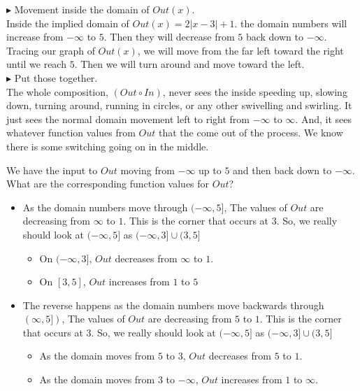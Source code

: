 \documentclass{ximera}
\begin{document}
\textbf{\textcolor{blue!75!black}{$\blacktriangleright$}}  Movement inside the domain of $Out(x)$.\\



Inside the implied domain of $Out(x) =2|x-3|+1$. the domain numbers will increase from $-\infty$ to $5$.  Then they will decrease from $5$ back down to $-\infty$. \\

Tracing our graph of $Out(x)$, we will move from the far left toward the right until we reach $5$.  Then we will turn around and move toward the left.\\



\textbf{\textcolor{blue!75!black}{$\blacktriangleright$}}  Put those together. \\

The whole composition, $(Out \circ In)$, never sees the inside speeding up, slowing down, turning around, running in circles, or any other swivelling and swirling.  It just sees the normal domain movement left to right from $-\infty$ to $\infty$.  And, it sees whatever function values from $Out$ that the come out of the process.  We know there is some switching going on in the middle.

We have the input to $Out$ moving from $-\infty$ up to $5$ and then back down to $-\infty$.  What are the corresponding function values for $Out$?





\begin{itemize}

\item As the domain numbers move through $(-\infty, 5]$, The values of $Out$ are decreasing from $\infty$ to $1$.  This is the corner that occurs at $3$.  So, we really should look at $(-\infty, 5]$  as  $(-\infty, 3] \cup (3,5]$

	\begin{itemize}[label=$\star$]
		\item On $(-\infty, 3]$, $Out$ decreases from $\infty$ to $1$.

		\item On $[3,5]$, $Out$ increases from $1$ to $5$

	\end{itemize}


\item The reverse happens as the domain numbers move backwards through $(\infty, 5])$, The values of $Out$ are decreasing from $5$ to $1$.  This is the corner that occurs at $3$.  So, we really should look at $(-\infty, 5]$  as  $(-\infty, 3] \cup (3,5]$

	\begin{itemize}[label=$\star$]
		\item As the domain moves from $5$ to $3$, $Out$ decreases from $5$ to $1$.

		\item As the domain moves from $3$ to $-\infty$, $Out$ increases from $1$ to $\infty$.

	\end{itemize}

\end{itemize}
\end{document}
